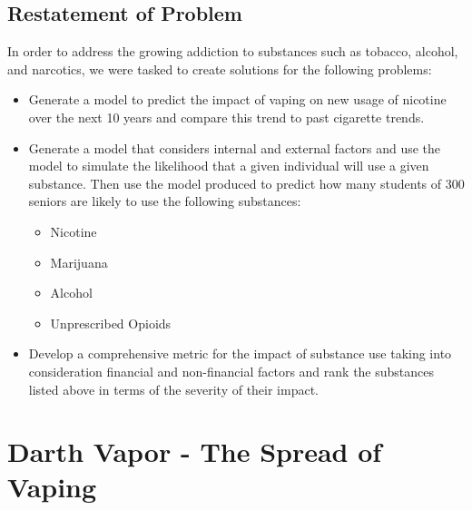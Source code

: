 \documentclass[12pt]{article}
\begin{document}
\subsection{Restatement of Problem}
In order to address the growing addiction to substances such as tobacco, alcohol, and narcotics, we were tasked to create solutions for the following problems:
\begin{itemize}
    \item Generate a model to predict the impact of vaping on new usage of nicotine over the next 10 years and compare this trend to past cigarette trends. 
    
    \item Generate a model that considers internal and external factors and use the model to simulate the likelihood that a given individual will use a given substance. Then use the model produced to predict how many students of 300 seniors are likely to use the following substances:
    \begin{itemize}
        \item Nicotine
        \item Marijuana
        \item Alcohol
        \item Unprescribed Opioids
    \end{itemize}

    \item Develop a comprehensive metric for the impact of substance use taking into consideration financial and non-financial factors and rank the substances listed above in terms of the severity of their impact.
\end{itemize}

\section{Darth Vapor - The Spread of Vaping}
\end{document}
